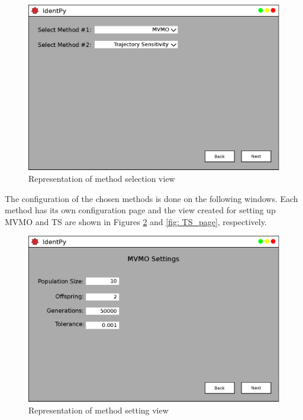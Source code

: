 \begin{figure}[h]
	\caption{Representation of method selection view}
	\begin{center}
		\includegraphics[scale=.5]{Images/Software_pg2.eps}
	\end{center}
	\label{fig: method_selection}
\end{figure}

The configuration of the chosen methods is done on the following windows. Each method has its own configuration page and the view created for setting up MVMO and TS are shown in Figures \ref{fig: MVMO_page} and \ref{fig: TS_page}, respectively.

\begin{figure}[h]
	\caption{Representation of method setting view}
	\begin{center}
		\includegraphics[scale=.5]{Images/Software_pg3.eps}
	\end{center}
	\label{fig: MVMO_page}
\end{figure}

